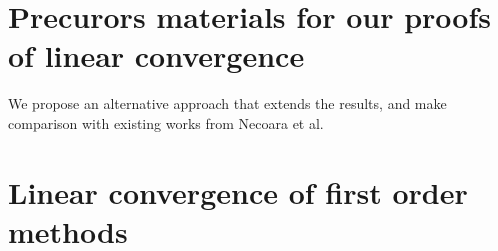 \documentclass[12pt]{article}
\begin{document}
\section{Precurors materials for our proofs of linear convergence}
    We propose an alternative approach that extends the results, and make comparison with existing works from Necoara et al. 


\section{Linear convergence of first order methods}
    

    






\end{document}
